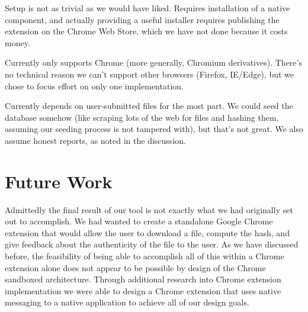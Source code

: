 \documentclass[letterpaper,twocolumn,10pt]{article}
\begin{document}
Setup is not as trivial as we would have liked. Requires installation of a native component, and actually providing a useful installer requires publishing the extension on the Chrome Web Store, which we have not done because it costs money.

Currently only supports Chrome (more generally, Chromium derivatives). There’s no technical reason we can’t support other browsers (Firefox, IE/Edge), but we chose to focus effort on only one implementation.

Currently depends on  user-submitted files for the most part. We could seed the database somehow (like scraping lots of the web for files and hashing them, assuming our seeding process is not tampered with), but that’s not great. We also assume honest reports, as noted in the discussion.

\section{Future Work}

Admittedly the final result of our tool is not exactly what we had originally set out to accomplish. We had wanted to create a standalone Google Chrome extension that would allow the user to download a file, compute the hash, and give feedback about the authenticity of the file to the user. As we have discussed before, the feasibility of being able to accomplish all of this within a Chrome extension alone does not appear to be possible by design of the Chrome sandboxed architecture. Through additional research into Chrome extension implementation we were able to design a Chrome extension that uses native messaging to a native application to achieve all of our design goals.

{\footnotesize 
}
\end{document}
